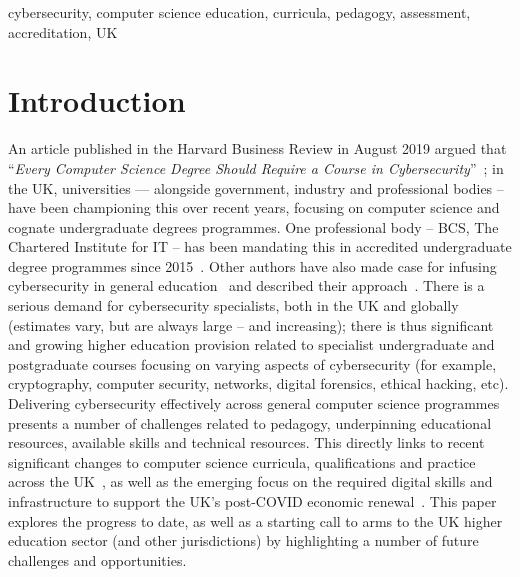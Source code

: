 \documentclass[conference]{IEEEtran}
\begin{document}
\begin{IEEEkeywords}
cybersecurity, computer science education, curricula, pedagogy,
assessment, accreditation, UK
\end{IEEEkeywords}

\section{Introduction}\label{sec:intro}

An article published in the Harvard Business Review in August 2019
argued that ``{\emph{Every Computer Science Degree Should Require a
Course in Cybersecurity}}''~\cite{cable_2019}; in the UK, universities
--- alongside government, industry and professional bodies -- have
been championing this over recent years, focusing on computer science
and cognate undergraduate degrees programmes. One professional body --
BCS, The Chartered Institute for IT -- has been mandating this in
accredited undergraduate degree programmes since
2015~\cite{Cricketal2019,itnowcyber:2019,itnowaccred:2020}. Other
authors have also made case for infusing cybersecurity in general
education~\cite{Sobiesk2015} and described their
approach~\cite{Blair2020}. There is a serious demand for cybersecurity
specialists, both in the UK and globally (estimates vary, but are
always large – and increasing); there is thus significant and growing
higher education provision related to specialist undergraduate and
postgraduate courses focusing on varying aspects of cybersecurity (for
example, cryptography, computer security, networks, digital forensics,
ethical hacking, etc). Delivering cybersecurity effectively across
general computer science programmes presents a number of challenges
related to pedagogy, underpinning educational resources, available
skills and technical resources. This directly links to recent
significant changes to computer science curricula, qualifications and
practice across the
UK~\cite{wgictreview:2013,brown-et-al:toce2014,davenport-et-al:latice2016,
murphy-et-al:programming2017,simon-et-al:sigcse2018,moller+crick:jce2018,davenport+crick:fmfun2019,prickett-et-al:iticse2020},
as well as the emerging focus on the required digital skills and
infrastructure to support the UK's post-COVID economic
renewal~\cite{foresightblog:2015,Cricketal2019,tryfonas+crick:petra2018,davenport-et-al:educon2020}. This
paper explores the progress to date, as well as a starting call to
arms to the UK higher education sector (and other jurisdictions) by
highlighting a number of future challenges and opportunities.
\end{document}
